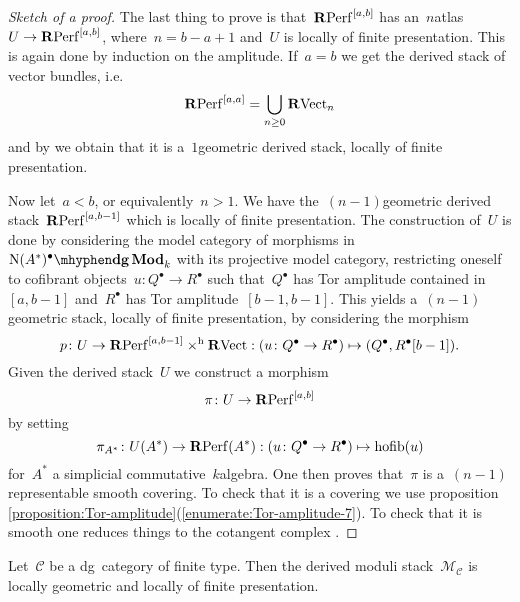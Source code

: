 \begin{refsection}
\begin{theorem}
\begin{proof}[Sketch of a proof]
    The last thing to prove is that~$\mathbf{R}\mathrm{Perf}^{[a,b]}$ has an~$n$\dash atlas~$U\to\mathbf{R}\mathrm{Perf}^{[a,b]}$, where~$n=b-a+1$ and~$U$ is locally of finite presentation. This is again done by induction on the amplitude. If~$a=b$ we get the derived stack of vector bundles, i.e.\
    \begin{equation}
      \mathbf{R}\mathrm{Perf}^{[a,a]}=\bigcup_{n\geq 0}\mathbf{R}\mathrm{Vect}_n
    \end{equation}
    and by \cite[corollary 1.3.7.4]{hagII} we obtain that it is a~$1$\dash geometric derived stack, locally of finite presentation.

    Now let~$a<b$, or equivalently~$n>1$. We have the~$(n-1)$\dash geometric derived stack~$\mathbf{R}\mathrm{Perf}^{[a,b-1]}$ which is locally of finite presentation. The construction of~$U$ is done by considering the model category of morphisms in~$\dgMod{\nerve(A^*)^\bullet}_k$ with its projective model category, restricting oneself to cofibrant objects~$u\colon Q^\bullet\to R^\bullet$ such that~$Q^\bullet$ has Tor amplitude contained in~$[a,b-1]$ and~$R^\bullet$ has Tor amplitude~$[b-1,b-1]$. This yields a~$(n-1)$\dash geometric stack, locally of finite presentation, by considering the morphism
    \begin{equation}
      p\colon U\to\mathbf{R}\mathrm{Perf}^{[a,b-1]}\times^{\mathrm{h}}\mathbf{R}\mathrm{Vect}:(u\colon Q^\bullet\to R^\bullet)\mapsto(Q^\bullet,R^\bullet[b-1]).
    \end{equation}
    Given the derived stack~$U$ we construct a morphism
    \begin{equation}
      \pi\colon U\to\mathbf{R}\mathrm{Perf}^{[a,b]}
    \end{equation}
    by setting
    \begin{equation}
      \pi_{A^*}\colon U(A^*)\to\mathbf{R}\mathrm{Perf}(A^*):(u\colon Q^\bullet\to R^\bullet)\mapsto\operatorname{hofib}(u)
    \end{equation}
    for~$A^*$ a simplicial commutative~$k$\dash algebra. One then proves that~$\pi$ is a~$(n-1)$\dash representable smooth covering. To check that it is a covering we use proposition \ref{proposition:Tor-amplitude}(\ref{enumerate:Tor-amplitude-7}). To check that it is smooth one reduces things to the cotangent complex \cite[corollary 2.2.5.3]{hagII}.
  \end{proof}
\end{theorem}

\begin{theorem}
  \label{theorem:main-theorem}
  Let~$\mathcal{C}$ be a dg~category of finite type. Then the derived moduli stack~$\mathcal{M}_{\mathcal{C}}$ is locally geometric and locally of finite presentation.


\end{theorem}
\end{refsection}
